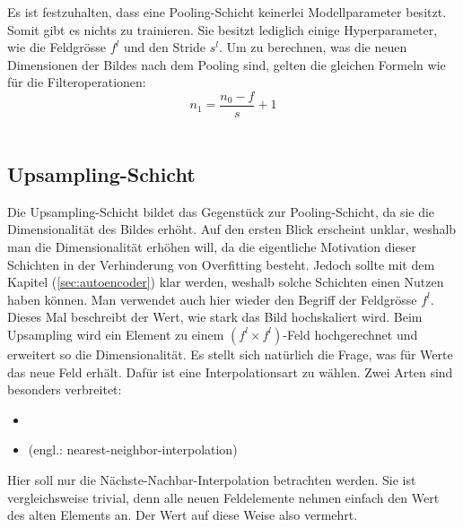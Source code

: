 \para{}
Es ist festzuhalten, dass eine Pooling-Schicht keinerlei Modellparameter
besitzt. Somit gibt es nichts zu trainieren. Sie besitzt lediglich einige
Hyperparameter, wie die Feldgrösse $f^l$ und den Stride $s^l$.
\para{}
Um zu berechnen, was die neuen Dimensionen der Bildes nach dem Pooling sind, gelten die
gleichen Formeln wie für die Filteroperationen:
\\
\begin{equation}
  n_1 = \frac{n_0 - f}{s} + 1
\end{equation}
\\


\cite{deeplearning.ai:cnn}
\cite{Goodfellow-et-al-2016}

\subsection{Upsampling-Schicht}
Die Upsampling-Schicht bildet das Gegenstück zur Pooling-Schicht, da sie die
Dimensionalität des Bildes erhöht. Auf den ersten Blick erscheint unklar,
weshalb man die Dimensionalität erhöhen will, da die eigentliche
Motivation dieser Schichten in der Verhinderung von Overfitting besteht. Jedoch
sollte mit dem Kapitel (\ref{sec:autoencoder}) klar werden, weshalb solche Schichten
einen Nutzen haben können.
\para{}
Man verwendet auch hier wieder den Begriff der Feldgrösse $f^l$. Dieses Mal
beschreibt der Wert, wie stark das Bild hochskaliert wird. Beim Upsampling
wird ein Element zu einem $(f^l \times f^l)$-Feld hochgerechnet und erweitert so die
Dimensionalität.
\para{}
Es stellt sich natürlich die Frage, was für Werte das neue Feld erhält.
Dafür ist eine Interpolationsart zu wählen.
Zwei Arten sind besonders verbreitet:
\begin{itemize}
\item{}
\item{ (engl.: nearest-neighbor-interpolation)}
\end{itemize}
Hier soll nur die Nächste-Nachbar-Interpolation betrachten werden. Sie ist
vergleichsweise trivial, denn alle neuen Feldelemente nehmen einfach den Wert des alten
Elements an. Der Wert auf diese Weise also vermehrt.
\para{}
\cite{deeplearning.ai:cnn}
\cite{Goodfellow-et-al-2016}

\pagebreak
